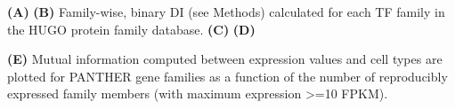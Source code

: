 \textbf{(A)}
\textbf{(B)} Family-wise, binary DI (see Methods) calculated for each TF family in the HUGO protein family database. 
\textbf{(C)}
\textbf{(D)}

\textbf{(E)} Mutual information computed between expression values and cell types are plotted for PANTHER gene families as a function of the number of reproducibly expressed family members (with maximum expression >=10 FPKM). 

